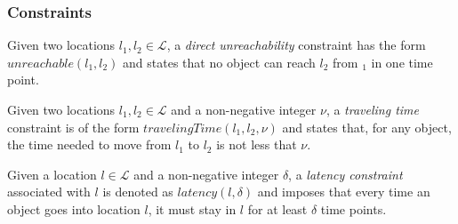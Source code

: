 
\begin{frame}[allowframebreaks]
\frametitle{Constraints}

\begin{definition}
  Given two locations $l_1, l_2 \in \mathcal{L}$, a \emph{direct unreachability} constraint has the form $unreachable(l_1,l_2)$ and states that no object can reach $l_2$ from $_1$ in one time point.
\end{definition}

\begin{definition}
  Given two locations $l_1, l_2 \in \mathcal{L}$ and a non-negative integer $\nu$, a \emph{traveling time} constraint is of the form $travelingTime(l_1, l_2, \nu)$ and states that, for any object, the time needed to move from $l_1$ to $l_2$ is not less that $\nu$.
\end{definition}

\begin{definition}
  Given a location $l \in \mathcal{L}$ and a non-negative integer $\delta$, a \emph{latency constraint} associated with $l$ is denoted as $latency(l,\delta)$ and imposes that every time an object goes into location $l$, it must stay in $l$ for at least $\delta$ time points.
\end{definition}

\vspace{15pt}

\end{frame}


